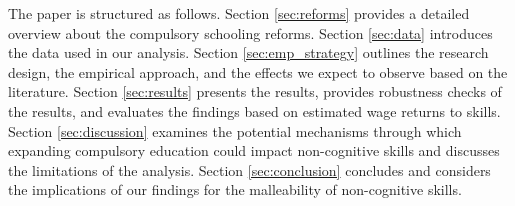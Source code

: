 The paper is structured as follows. Section \ref{sec:reforms} provides a detailed overview about the compulsory schooling reforms. Section \ref{sec:data} introduces the data used in our analysis. Section \ref{sec:emp_strategy} outlines the research design, the empirical approach, and the effects we expect to observe based on the literature. Section \ref{sec:results} presents the results, provides robustness checks of the results, and evaluates the findings based on estimated wage returns to skills. Section \ref{sec:discussion} examines the potential mechanisms through which expanding compulsory education could impact non-cognitive skills and discusses the limitations of the analysis. Section \ref{sec:conclusion} concludes and considers the implications of our findings for the malleability of non-cognitive skills.

